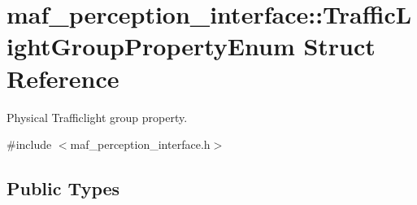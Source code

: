\hypertarget{structmaf__perception__interface_1_1TrafficLightGroupPropertyEnum}{}\section{maf\+\_\+perception\+\_\+interface\+:\+:Traffic\+Light\+Group\+Property\+Enum Struct Reference}
\label{structmaf__perception__interface_1_1TrafficLightGroupPropertyEnum}


Physical Trafficlight group property.  




{\ttfamily \#include $<$maf\+\_\+perception\+\_\+interface.\+h$>$}

\subsection*{Public Types}
